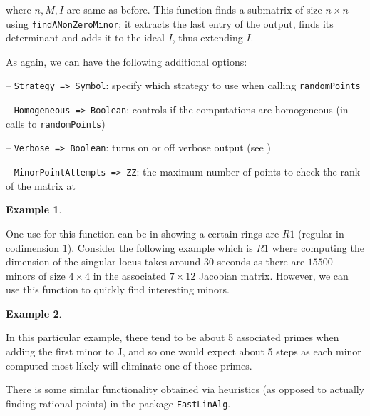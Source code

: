 \documentclass[11pt]{amsart}
\theoremstyle{definition}
\newtheorem{example}{Example}[section]
\begin{document}
\vspace{1em}
\noindent where $n,M,I$ are same as before. This function finds a submatrix of size $n\times n$ using {\tt findANonZeroMinor};  
it extracts the last entry of the output, finds its determinant and
adds it to the ideal $I$, thus extending $I$. 


As again, we can have the following additional options:

\vspace{1em}
-- {\tt Strategy => Symbol}: specify which strategy to use when calling {\tt randomPoints}

-- {\tt Homogeneous => Boolean}: controls if the computations are homogeneous (in calls to {\tt randomPoints})


-- {\tt Verbose => Boolean}: turns on or off verbose output (see )

-- {\tt MinorPointAttempts => ZZ}: the maximum number of points to check the rank of the matrix at    

  

\begin{example}
	
\end{example}

One use for this function can be in showing a certain rings are $R1$ (regular in codimension $1$).
Consider the following example which is $R1$ where computing the dimension of the singular locus takes around $30$ seconds as there are $15500$ minors of size $4 \times 4$ in the associated $7 \times 12$ Jacobian matrix.  However, we can use this function to quickly find interesting minors.
\begin{example}
	
	\end{example} 

In this particular example, there tend to be about 5 associated primes when adding the first minor to J, and so one would expect about 5 steps as each minor computed most likely will eliminate one of those primes.

There is some similar functionality obtained via heuristics (as opposed to actually finding rational points) in the package {\tt FastLinAlg}.


\vspace{2em}
\end{document}
